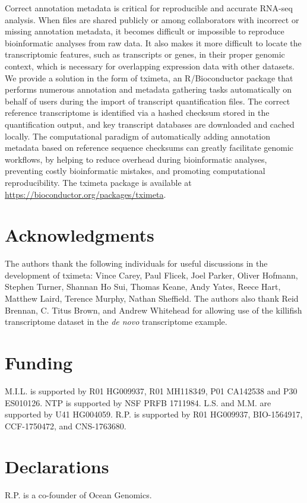 \documentclass[10pt,letterpaper]{article}
\begin{document}
Correct annotation metadata is critical for reproducible and accurate
RNA-seq analysis. When files are shared publicly or among
collaborators with incorrect or missing annotation metadata, it
becomes difficult or impossible to reproduce bioinformatic analyses
from raw data. It also makes it more difficult to locate the
transcriptomic features, such as transcripts or genes, in their proper
genomic context, which is necessary for overlapping expression data
with other datasets. We provide a solution in the form of tximeta, an
R/Bioconductor package that performs numerous annotation and
metadata gathering tasks automatically on behalf of users during the
import of transcript quantification files. The correct reference
transcriptome is identified via a hashed checksum stored in the
quantification output, and key transcript databases are downloaded and
cached locally. The computational paradigm of automatically adding
annotation metadata based on reference sequence checksums can greatly
facilitate genomic workflows, by helping to reduce overhead during
bioinformatic analyses, preventing costly bioinformatic mistakes, and
promoting computational reproducibility.
The tximeta package is
available at \url{https://bioconductor.org/packages/tximeta}.

\linenumbers



\section*{Acknowledgments}

The authors thank the following individuals for useful discussions 
in the development of tximeta: Vince Carey, Paul Flicek, Joel Parker,
Oliver Hofmann, Stephen Turner, Shannan Ho Sui, Thomas Keane, Andy
Yates, Reece Hart, Matthew Laird, Terence Murphy, Nathan Sheffield.
The authors also thank Reid Brennan, C. Titus Brown, and Andrew
Whitehead for allowing use of the killifish transcriptome dataset in
the \textit{de novo} transcriptome example.

\section*{Funding}

M.I.L. is supported by R01 HG009937, R01 MH118349, P01 CA142538 and
P30 ES010126.
NTP is supported by NSF PRFB 1711984.
L.S. and M.M. are supported by U41 HG004059.
R.P. is supported by R01 HG009937, BIO-1564917, CCF-1750472, and
CNS-1763680. 

\section*{Declarations}

R.P. is a co-founder of Ocean Genomics.

\nolinenumbers


\end{document}
